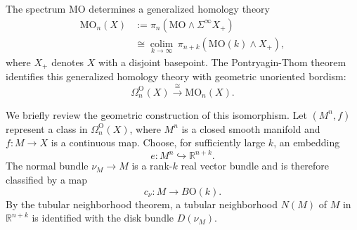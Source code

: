 \documentclass[aps,prx,reprint,superscriptaddress,twocolumn,amsmath,amssymb,amsfonts, nofootinbib]{revtex4-2}
\theoremstyle{apsstyle}
\begin{document}
The spectrum $\mathrm{MO}$ determines a generalized homology theory
\begin{equation}
\begin{aligned}
    \mathrm{MO}_{n}(X)
    &:=
    \pi_{n}\left(
        \mathrm{MO}\wedge\Sigma^{\infty}X_{+}
    \right)
\\
    &\cong
    \underset{k\to\infty}{\operatorname{colim}}\,
    \pi_{n+k}\left(
        \mathrm{MO}(k)\wedge X_{+}
    \right),
\end{aligned}
\label{eq:MO_generalized_homology}
\end{equation}
where $X_{+}$ denotes $X$ with a disjoint basepoint. The
Pontryagin-Thom theorem identifies this generalized homology theory with
geometric unoriented bordism:
\begin{equation}
    \Omega_{n}^{\mathrm{O}}(X)
    \xrightarrow{\;\cong\;}
    \mathrm{MO}_{n}(X).
    \label{eq:PT_general_isomorphism}
\end{equation}

\noindent We briefly review the geometric construction of this isomorphism. Let
$(M^{n},f)$ represent a class in $\Omega_{n}^{\mathrm{O}}(X)$, where
$M^{n}$ is a closed smooth manifold and $f:M\to X$ is a continuous map.
Choose, for sufficiently large $k$, an embedding
\begin{equation*}
    e:M^{n}\hookrightarrow\mathbb{R}^{n+k}.
\end{equation*}
The normal bundle $\nu_{M}\to M$ is a rank-$k$ real vector bundle and is
therefore classified by a map
\begin{equation*}
    c_{\nu}:M\longrightarrow B\mathrm{O}(k).
\end{equation*}
By the tubular neighborhood theorem, a tubular neighborhood $N(M)$ of
$M$ in $\mathbb{R}^{n+k}$ is identified with the disk bundle
$D(\nu_{M})$.
\end{document}
